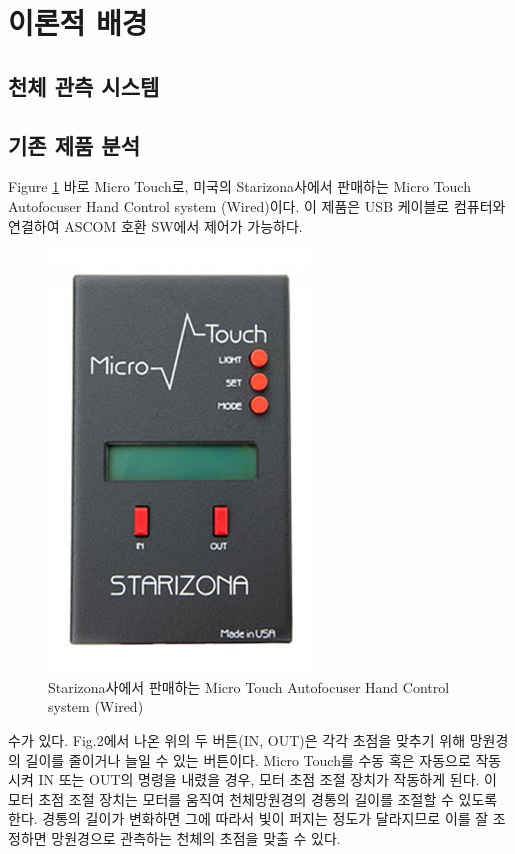 \section{이론적 배경}

\subsection{천체 관측 시스템}




\subsection{기존 제품 분석}

Figure \ref{fig:microtouch_3} \가 바로 Micro Touch로, 미국의 Starizona사에서 판매하는 Micro Touch Autofocuser Hand Control system (Wired)이다. 이 제품은 USB 케이블로 컴퓨터와 연결하여 ASCOM 호환 SW에서 제어가 가능하다. 

\begin{figure}[h]
	\includegraphics[width=0.6\linewidth]{microtouch_3}
	\caption{Starizona사에서 판매하는 Micro Touch Autofocuser Hand Control system (Wired)}
	\label{fig:microtouch_3}
\end{figure}

수가 있다. Fig.2에서 나온 위의 두 버튼(IN, OUT)은 각각 초점을 맞추기 위해 망원경의 길이를 줄이거나 늘일 수 있는 버튼이다. Micro Touch를 수동 혹은 자동으로 작동시켜 IN 또는 OUT의 명령을 내렸을 경우, 모터 초점 조절 장치가 작동하게 된다. 이 모터 초점 조절 장치는 모터를 움직여 천체망원경의 경통의 길이를 조절할 수 있도록 한다. 경통의 길이가 변화하면 그에 따라서 빛이 퍼지는 정도가 달라지므로 이를 잘 조정하면 망원경으로 관측하는 천체의 초점을 맞출 수 있다.

